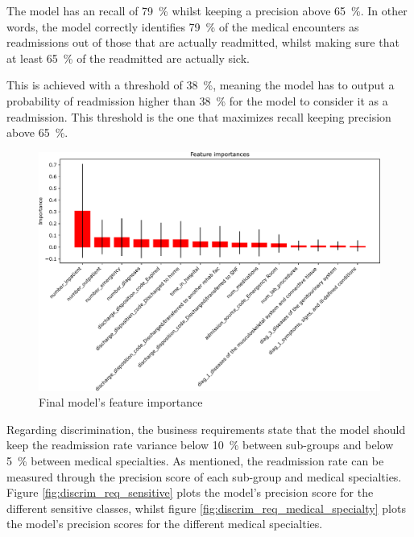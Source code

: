 \documentclass[a4paper,11pt]{article}
\begin{document}
The model has an recall of \SI{79}{\percent} whilst keeping a precision above \SI{65}{\percent}. In other words, the model correctly identifies \SI{79}{\percent} of the medical encounters as readmissions out of those that are actually readmitted, whilst making sure that at least \SI{65}{\percent} of the readmitted are actually sick.

This is achieved with a threshold of \SI{38}{\percent}, meaning the model has to output a probability of readmission higher than \SI{38}{\percent} for the model to consider it as a readmission. This threshold is the one that maximizes recall keeping precision above \SI{65}{\percent}.


\begin{figure}[!htb]
	\centering
	\includegraphics[width=1\textwidth]{images/feature_importance.pdf}
	\caption{Final model's feature importance}
	\label{fig:feature_importance}
\end{figure}


Regarding discrimination, the business requirements state that the model should keep the readmission rate variance below \SI{10}{\percent} between sub-groups and below \SI{5}{\percent} between medical specialties. As mentioned, the readmission rate can be measured through the precision score of each sub-group and medical specialties.
Figure \ref{fig:discrim_req_sensitive} plots the model's precision score for the different sensitive classes, whilst figure \ref{fig:discrim_req_medical_specialty} plots the model's precision scores for the different medical specialties.
\end{document}
